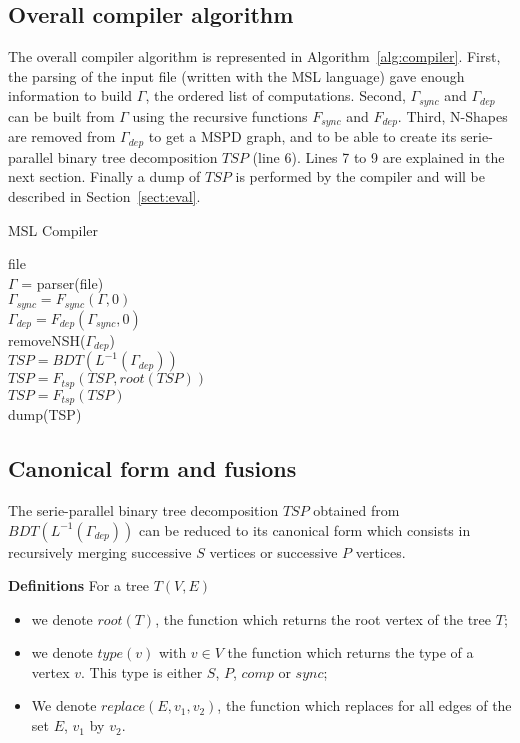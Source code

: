 \subsection{Overall compiler algorithm}

The overall compiler algorithm is represented in Algorithm~\ref{alg:compiler}. First, the parsing of the input file (written with the MSL language) gave enough information to build $\Gamma$, the ordered list of computations. Second, $\Gamma_{sync}$ and $\Gamma_{dep}$ can be built from $\Gamma$ using the recursive functions $F_{sync}$ and $F_{dep}$. Third, N-Shapes are removed from $\Gamma_{dep}$ to get a MSPD graph, and to be able to create its serie-parallel binary tree decomposition $TSP$ (line 6). Lines 7 to 9 are explained in the next section. Finally a dump of $TSP$ is performed by the compiler and will be described in Section~\ref{sect:eval}.

\begin{algorithm}
\caption{MSL Compiler}
\label{alg:compiler}
\begin{algorithmic}[1]
 {file}
\\$\Gamma$ = parser(file)
\\$\Gamma_{sync} = F_{sync}(\Gamma,0)$
\\$\Gamma_{dep} = F_{dep}(\Gamma_{sync},0)$
\\removeNSH($\Gamma_{dep}$)
\\$TSP = BDT(L^{-1}(\Gamma_{dep}))$
\\$TSP = F_{tsp}(TSP,root(TSP))$
\\$TSP = F_{tsp}(TSP)$
\EndIf
\\dump(TSP)
\EndProcedure
\end{algorithmic}
\end{algorithm}

\subsection{Canonical form and fusions}

The serie-parallel binary tree decomposition $TSP$ obtained from $BDT(L^{-1}(\Gamma_{dep}))$ can be reduced to its canonical form which consists in recursively merging successive $S$ vertices or successive $P$ vertices.

\medskip
\noindent \textbf{Definitions} For a tree $T(V,E)$
\begin{itemize}
\item we denote $root(T)$, the function which returns the root vertex of the tree $T$;
\item we denote $type(v)$ with $v \in V$ the function which returns the type of a vertex $v$. This type is either $S$, $P$, $comp$ or $sync$;
\item We denote $replace(E,v_1,v_2)$, the function which replaces for all edges of the set $E$, $v_1$ by $v_2$.
\end{itemize}

